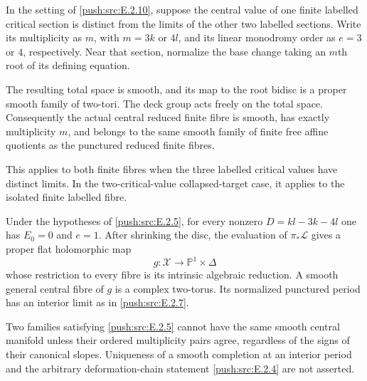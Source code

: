 
\begin{proposition}\hypertarget{tag-032Y}{}\label{push:src:E.2.13}


In the setting of \ref{push:src:E.2.10}, suppose the central value of
one finite labelled critical section is distinct from
the limits of the other two labelled sections.  Write
its multiplicity as $m$, with $m=3k$ or $4l$, and its
linear monodromy order as $e=3$ or $4$, respectively.
Near that section, normalize the base change taking
an $m$th root of its defining equation.

The resulting total space is smooth, and its map to
the root bidisc is a proper smooth family of two-tori.
The deck group acts freely on the total space.
Consequently the actual central reduced finite fibre
is smooth, has exactly multiplicity $m$, and belongs
to the same smooth family of finite free affine
quotients as the punctured reduced finite fibres.

This applies to both finite fibres when the three
labelled critical values have distinct limits.  In
the two-critical-value collapsed-target case, it
applies to the isolated finite labelled fibre.
\end{proposition}

\begin{proposition}\hypertarget{tag-032V}{}\label{push:src:E.2.10}


Under the hypotheses of \ref{push:src:E.2.5}, for every nonzero
$D=kl-3k-4l$ one has $E_0=0$ and $e=1$.
After shrinking the disc, the evaluation of
$\pi_*\mathcal L$ gives a proper flat holomorphic map
\[
 g:\mathcal X\longrightarrow\mathbb P^1\times\Delta
\]
whose restriction to every fibre is its intrinsic algebraic
reduction.  A smooth general central fibre of $g$ is a
complex two-torus.  Its normalized punctured period has
an interior limit as in \ref{push:src:E.2.7}.

Two families satisfying \ref{push:src:E.2.5} cannot have the same smooth
central manifold unless their ordered multiplicity pairs
agree, regardless of the signs of their canonical slopes.
Uniqueness of a smooth completion at an interior period and
the arbitrary deformation-chain statement \ref{push:src:E.2.4} are not
asserted.
\end{proposition}

